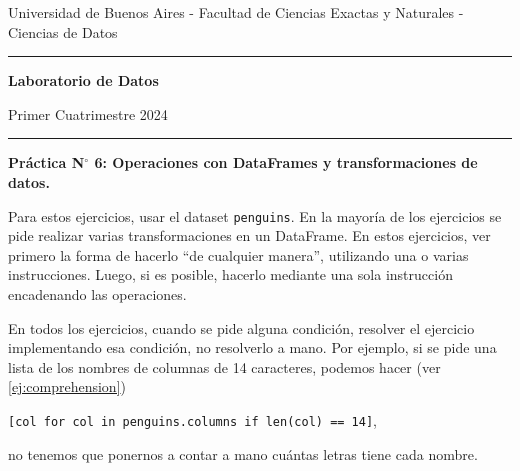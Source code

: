 \documentclass[a4paper,11pt]{article}
\theoremstyle{definition}
\begin{document}
\centerline{{\small Universidad de Buenos Aires - Facultad de Ciencias Exactas y Naturales - Ciencias de Datos}}

\vskip 0.2cm

\hrule

\vskip 0.2cm

 \centerline{{\bf\Large{\sc Laboratorio de Datos}}}

 \vskip 0.2cm

 \centerline{\ttfamily Primer Cuatrimestre 2024}

\vskip 0.2cm

 \hrule

 \bigskip
 \centerline{\bf Práctica N$^\circ$ 6: Operaciones con DataFrames y transformaciones de datos.}
 \bigskip



Para estos ejercicios, usar el dataset \lstinline{penguins}. En la mayoría de los ejercicios se pide realizar varias transformaciones en un DataFrame. En estos ejercicios, ver primero la forma de hacerlo ``de cualquier manera'', utilizando una o varias instrucciones. Luego, si es posible, hacerlo mediante una sola instrucción encadenando las operaciones.

En todos los ejercicios, cuando se pide alguna condición, resolver el ejercicio implementando esa condición, no resolverlo a mano. Por ejemplo, si se pide una lista de los nombres de columnas de 14 caracteres, podemos hacer (ver \ref{ej:comprehension})

\lstinline{[col for col in penguins.columns if len(col) == 14]},

no tenemos que ponernos a contar a mano cu\'antas letras tiene cada nombre.
\end{document}
